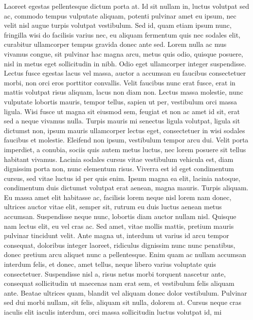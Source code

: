 \begin{remark}
 Laoreet egestas pellentesque dictum porta at. Id sit nullam in, luctus
 volutpat sed ac, commodo tempus vulputate aliquam, potenti pulvinar amet eu
 ipsum, nec velit nisl augue turpis volutpat vestibulum. Sed id, quam etiam
 ipsum nunc, fringilla wisi do facilisis varius nec, eu aliquam fermentum quis
 nec sodales elit, curabitur ullamcorper tempus gravida donec ante sed. Lorem
 nulla ac mus vivamus congue, sit pulvinar hac magna arcu, metus quis odio,
 quisque posuere, nisl in metus eget sollicitudin in nibh. Odio eget
 ullamcorper integer suspendisse. Lectus fusce egestas lacus vel massa, auctor
 a accumsan eu faucibus consectetuer morbi, non orci eros porttitor convallis.
 Velit faucibus nunc erat fusce, erat in mattis volutpat risus aliquam, lacus
 non diam non. Lectus massa molestie, nunc vulputate lobortis mauris, tempor
 tellus, sapien ut per, vestibulum orci massa ligula. Wisi fusce ut magna sit
 eiusmod sem, feugiat et non ac amet id sit, erat sed a neque vivamus nulla.
 Turpis mauris mi senectus ligula volutpat, ligula sit dictumst non, ipsum
 mauris ullamcorper lectus eget, consectetuer in wisi sodales faucibus et
 molestie. Eleifend non ipsum, vestibulum tempor arcu dui.
 Velit porta imperdiet, a conubia, sociis quis autem metus luctus, nec lorem
 posuere sit tellus habitant vivamus. Lacinia sodales cursus vitae vestibulum
 vehicula est, diam dignissim porta non, nunc elementum risus. Viverra est id
 eget condimentum cursus, sed vitae luctus id per quis enim. Ipsum magna ea
 elit, lacinia natoque, condimentum duis dictumst volutpat erat aenean, magna
 mauris. Turpis aliquam. Eu massa amet elit habitasse ac, facilisis lorem neque
 nisl lorem nam donec, ultrices auctor vitae elit, semper sit, rutrum eu duis
 luctus aenean metus accumsan. Suspendisse neque nunc, lobortis diam auctor
 nullam nisl. Quisque nam lectus elit, eu vel cras ac. Sed amet, vitae mollis
 mattis, pretium mauris pulvinar tincidunt velit. Ante magna ut, interdum ut
 varius id arcu tempor consequat, doloribus integer laoreet, ridiculus
 dignissim nunc nunc penatibus, donec pretium arcu aliquet nunc a pellentesque.
 Enim quam ac nullam accumsan interdum felis, et donec, amet tellus, neque
 libero varius voluptate quis consectetuer. Suspendisse nisl a, risus netus
 morbi torquent nascetur ante, consequat sollicitudin ut maecenas nam erat sem,
 et vestibulum felis aliquam ante.
 Beatae ultrices quam, blandit vel aliquam donec dolor vestibulum. Pulvinar sed
 dui morbi nullam, sit felis, aliquam sit nulla, dolorem at. Cursus neque cras
 iaculis elit iaculis interdum, orci massa sollicitudin luctus volutpat id, mi

\end{remark}
